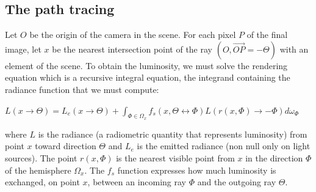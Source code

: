 %
%
%
%

\subsection{The path tracing}

Let $O$ be the origin of the camera in the scene. For each pixel $P$ of the final image, let $x$ be the nearest intersection point of the ray $(O, \overrightarrow{OP} = -\Theta)$ with an element of the scene. To obtain the luminosity, we must solve the rendering equation \cite{Ka86} which is a recursive integral equation, the integrand containing the radiance function that we must compute:
\begin{center}
$L(x \rightarrow \Theta) = L_e(x \rightarrow \Theta) + \int_{\Phi \in \Omega_x} f_s(x, \Theta \leftrightarrow \Phi) L(r(x, \Phi) \rightarrow -\Phi) d\omega_\Phi$
\end{center}
where $L$ is the radiance (a radiometric quantity that represents luminosity) from point $x$ toward direction $\Theta$ and $L_e$ is the emitted radiance (non null only on light sources). The point $r(x, \Phi)$ is the nearest visible point from $x$ in the direction $\Phi$ of the hemisphere $\Omega_x$. The $f_s$ function expresses how much luminosity is exchanged, on point $x$, between an incoming ray $\Phi$ and the outgoing ray $\Theta$.

